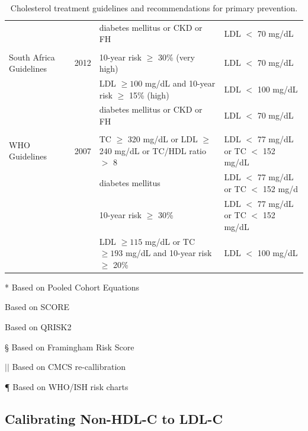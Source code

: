 \documentclass[12pt]{article}
\begin{document}
\begin{appendix}
\begin{table}[H]
{\begin{threeparttable}
\begin{tabular}{llll}
            & & diabetes mellitus or CKD or FH & LDL $<$ 70 mg/dL \\
            & & & \\
            South Africa Guidelines \cite{anderson_2012_2013} & 2012 & 10-year risk\tnote{\S} \hspace{1pt} $\geq$ 30\% (very high) & LDL $<$ 70 mg/dL \\
            & & LDL $\geq 100$ mg/dL and 10-year risk\tnote{\S} \hspace{1pt}  $\geq$ 15\% (high) & LDL $<$ 100 mg/dL \\
            & & diabetes mellitus or CKD or FH & LDL $<$ 70 mg/dL \\
            & & & \\
            WHO Guidelines \cite{anderson_2012_2013} & 2007 & TC $\geq$ 320 mg/dL or LDL $\geq$ 240 mg/dL or TC/HDL ratio $>$ 8 & LDL $<$ 77 mg/dL or TC $<$ 152 mg/dL \\
            & & diabetes mellitus & LDL $<$ 77 mg/dL or TC $<$ 152 mg/d  \\
            & & 10-year risk\tnote{\P} \hspace{1pt} $\geq$ 30\% & LDL $<$ 77 mg/dL or TC $<$ 152 mg/dL \\
            & & LDL $\geq 115$ mg/dL or TC $\geq 193$ mg/dL and 10-year risk\tnote{\P} \hspace{1pt}  $\geq$ 20\% & LDL $<$ 100 mg/dL \\
            \bottomrule
        \end{tabular}
        \begin{tablenotes}
            \item[*] Based on Pooled Cohort Equations
            \item[\textdagger] Based on SCORE
            \item[\ddag] Based on QRISK2
            \item[\S] Based on Framingham Risk Score
            \item[$||$] Based on CMCS re-callibration
            \item[\P] Based on WHO/ISH risk charts
        \end{tablenotes}
        \end{threeparttable}
        }
        \caption{Cholesterol treatment guidelines and recommendations for primary prevention.}
        \label{tab:guidelines}
    \end{table}

    \subsection{Calibrating Non-HDL-C to LDL-C}



\end{appendix}
\end{document}
